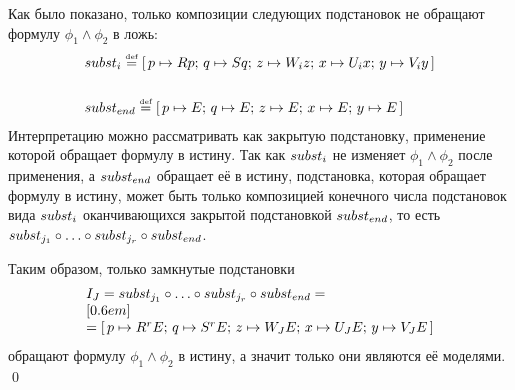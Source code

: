 \begin{proof*}
Как было показано, только композиции следующих подстановок не обращают формулу $\phi_{1} \land \phi_{2}$ в ложь:
\[
\begin{array}{l}

    subst_{i} \mathrel{\stackrel{\mbox{\normalfont\tiny def}}{=}}\textrm{[} \, p \mapsto {R}p; \, q \mapsto {S}q; \,
    z \mapsto {W}_{i}z; \,
    x \mapsto {U}_{i}x; \,
    y \mapsto {V}_{i}y \, \textrm{]} \\
    [0.6em] \\
    subst_{end} \mathrel{\stackrel{\mbox{\normalfont\tiny def}}{=}} \textrm{[} \, p \mapsto {E}; \, q \mapsto {E}; \,
    z \mapsto {E}; \, x \mapsto {E}; \,
    y \mapsto {E} \, \textrm{]}

\end{array}
\]
Интерпретацию можно рассматривать как закрытую подстановку, применение которой обращает формулу в истину. Так как $subst_{i}$ не изменяет $\phi_{1} \land \phi_{2}$ после применения, а $subst_{end}$ обращает её в истину, подстановка, которая обращает формулу в истину, может быть только композицией конечного числа подстановок вида  $subst_{i}$ оканчивающихся закрытой подстановкой $subst_{end}$, то есть $subst_{j_1} \circ \ldots \circ subst_{j_r} \circ subst_{end}$.

Таким образом, только замкнутые подстановки
\[
    \begin{array}{l}
    I_{J} =
    subst_{j_1} \circ \ldots \circ subst_{j_r} \circ subst_{end} = \\
    [0.6em] \\
    = \textrm{[} \, 
    p \mapsto {R}^{r}{E}; \, q \mapsto {S}^{r}{E}; \,
    z \mapsto {W}_{J}{E}; \, x \mapsto {U}_{J}{E}; \,
    y \mapsto {V}_{J}{E} \, \textrm{]}
    \end{array}
\]
обращают формулу $\phi_{1} \land \phi_{2}$ в истину, а значит только они являются её моделями.
\qed\end{proof*}

